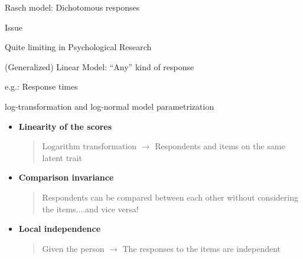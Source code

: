 \documentclass{beamer}
\begin{document}
\begin{frame}
	Rasch model: Dichotomous responses 
	
	\begin{alertblock}{Issue}
		
		Quite limiting in Psychological Research
	\end{alertblock}

(Generalized) Linear Model: ``Any'' kind of response

\begin{exampleblock}{e.g.: Response times}
	
	log-transformation and log-normal model parametrization
\end{exampleblock} 
\end{frame}

\begin{frame}
	\begin{itemize}
		\item \textbf{\textcolor{template}{Linearity of the scores}}
		\begin{quote}
			Logarithm transformation $\rightarrow$ Respondents and items on the same latent trait
		\end{quote}
		\item \textbf{\textcolor{template}{Comparison invariance}}
		\begin{quote}
			Respondents can be compared between each other without considering the items....and vice versa!
		\end{quote}
	\large
		\item \textbf{\textcolor{template}{Local independence}}
		\begin{quote}
			Given the person $\rightarrow$ The responses to the items are independent
		\end{quote}
	\end{itemize}
\end{frame}
\end{document}
